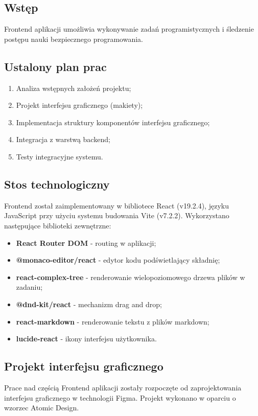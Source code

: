 \documentclass[12pt,a4paper]{article}
\begin{document}
\subsection{Wstęp}
Frontend aplikacji umożliwia wykonywanie zadań programistycznych i śledzenie postępu nauki bezpiecznego programowania. 

\subsection{Ustalony plan prac}
\begin{enumerate}
    \item Analiza wstępnych założeń projektu;
    \item Projekt interfejsu graficznego (makiety);
    \item Implementacja struktury komponentów interfejsu graficznego;
    \item Integracja z warstwą backend;
    \item Testy integracyjne systemu.
\end{enumerate}

\subsection{Stos technologiczny}
Frontend został zaimplementowany w bibliotece React (v19.2.4), języku JavaScript przy użyciu systemu budowania Vite (v7.2.2).
Wykorzystano następujące biblioteki zewnętrzne:
\begin{itemize}
    \item \textbf{React Router DOM} - routing w aplikacji;
    \item \textbf{@monaco-editor/react} - edytor kodu podświetlający składnię;
    \item \textbf{react-complex-tree} - renderowanie wielopoziomowego drzewa plików w zadaniu;
    \item \textbf{@dnd-kit/react} - mechanizm drag and drop;
    \item \textbf{react-markdown} - renderowanie tekstu z plików markdown;
    \item \textbf{lucide-react} - ikony interfejsu użytkownika.
\end{itemize}

\subsection{Projekt interfejsu graficznego}
Prace nad częścią Frontend aplikacji zostały rozpoczęte od zaprojektowania interfejsu graficznego w technologii Figma. Projekt wykonano w oparciu o wzorzec Atomic Design.
\end{document}
